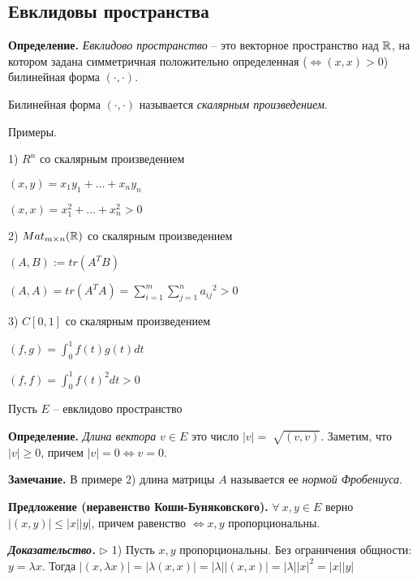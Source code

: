 \subsection{Евклидовы пространства}

\textbf{Определение.} \textit{Евклидово пространство} -- это векторное пространство над $\mathbb{R}$, на котором задана симметричная положительно определенная ($\Leftrightarrow (x, x) > 0$) билинейная форма $(\cdot, \cdot)$.

Билинейная форма $( \cdot, \cdot)$ называется \textit{скалярным произведением}.

\vspace{\baselineskip}
Примеры.

1) $R^n$ со скалярным произведением

$(x, y) = x_1 y_1 + \dots + x_n y_n$

$(x, x) = x_1^2 + \dots + x_n^2 > 0$

2) $Mat_{m \times n} (\mathbb{R})$ со скалярным произведением

$(A, B) := tr (A^T B)$

$(A, A) = tr (A^T A) = \sum\limits_{i = 1}^m \sum\limits_{j = 1}^n {a_{ij}}^2 > 0$

3) $C[0, 1]$ со скалярным произведением 

$(f, g) = \int_0^1 f(t) g(t) dt$

$(f, f) = \int_0^1 {f(t)^2} dt > 0$

\vspace{\baselineskip}
Пусть $E$ -- евклидово пространство

\vspace{\baselineskip}
\textbf{Определение.} \textit{Длина вектора} $v \in E$ это число $|v| = \sqrt[]{(v, v)}$. Заметим, что $|v| \geq 0$, причем $|v| = 0 \Leftrightarrow v = 0$.

\vspace{\baselineskip}
\textbf{Замечание.} В примере 2) длина матрицы $A$ называется ее \textit{нормой Фробениуса}.

\vspace{\baselineskip}
\textbf{Предложение (неравенство Коши-Буняковского).} $\forall \ x, y \in E$ верно $|(x, y)| \leq |x| |y|$, причем равенство $\Leftrightarrow x, y$ пропорциональны.

\vspace{\baselineskip}
\textbf{\textit{Доказательство.}} $\rhd$ 1) Пусть $x, y$ пропорциональны. Без ограничения общности: $y = \lambda x$. Тогда $|(x, \lambda x)| = |\lambda(x, x)| = |\lambda||(x, x)| = |\lambda||x|^2 = |x||y|$

